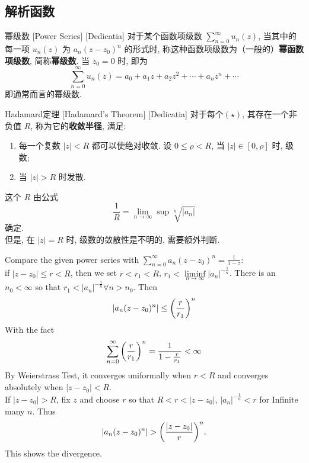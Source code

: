     \subsection{解析函数}

        \begin{dfn}
            {幂级数}
            [Power Series]
            [Dedicatia]
            对于某个函数项级数 \(\sum_{n = 0}^{\infty} u_n(z) \), 当其中的每一项 \(u_n(z)\) 为 \(a_n(z-z_0)^n\) 的形式时, 称这种函数项级数为（一般的）\textbf{幂函数项级数}, 简称\textbf{幂级数}. 当 \(z_0=0\) 时, 即为
            \[\sum_{n = 0}^{\infty} u_n(z)=a_0+a_1z+a_2z^2+\cdots+a_nz^n+\cdots \tag{ \(\star\) }\]
            即通常而言的幂级数. 
        \end{dfn}

        \begin{thm}
            [Hadamard]
            {Hadamard定理}
            [Hadamard's Theorem]
            [Dedicatia]
            对于每个\PowerSeries  \((\star)\), 其存在一个非负值 \(R\), 称为它的\textbf{收敛半径}, 满足: 
            \begin{enumerate}
                \item 每一个复数 \(|z|<R\) 都可以使\PowerSeries 绝对收敛. 设 \(0\leqslant\rho <R\), 当 \(|z|\in[0,\rho]\) 时, 级数\UniformConvergent{}; 
                \item 当 \(|z|>R\) 时\PowerSeries 发散.
            \end{enumerate}
            这个 \(R\) 由公式
            \[\frac{1}{R}=\lim_{n\to \infty}\sup\sqrt[n]{|a_n|}\]
            确定. \\
            但是, 在 \(|z|=R\) 时, 级数的敛散性是不明的, 需要额外判断. 
        \end{thm}

        \begin{prf}
            Compare the given power series with $\sum\limits_{n=0}^{\infty}a_n(z-z_0)^n=\frac{1}{1-z}$:\\
            if $|z-z_0|\leq r<R$, then we set $r<r_1<R$, $r_1<\liminf\limits_{n\to\infty}|a_n|^{-\frac{1}{n}}$. There is an $n_0<\infty$ so that $r_1<|a_n|^{-\frac{1}{n}}\forall n>n_0$. Then
            \[|a_n(z-z_0)^n|\leq\qty(\frac{r}{r_1})^n\]
            With the fact
            \[\sum_{n=0}^{\infty}\qty(\frac{r}{r_1})^n=\frac{1}{1-\frac{r}{r_1}}<\infty\]
            By Weierstrass Test, it converges uniformally when $r<R$ and converges absolutely when $|z-z_0|<R$.\\
            If $|z-z_0|>R$, fix $z$ and choose $r$ so that $R<r<|z-z_0|$, $|a_n|^{-\frac{1}{n}}<r$ for Infinite many $n$. Thus
            \[|a_n(z-z_0)^n|>\qty(\frac{|z-z_0|}{r})^n.\]
            This shows the divergence.
        \end{prf}


